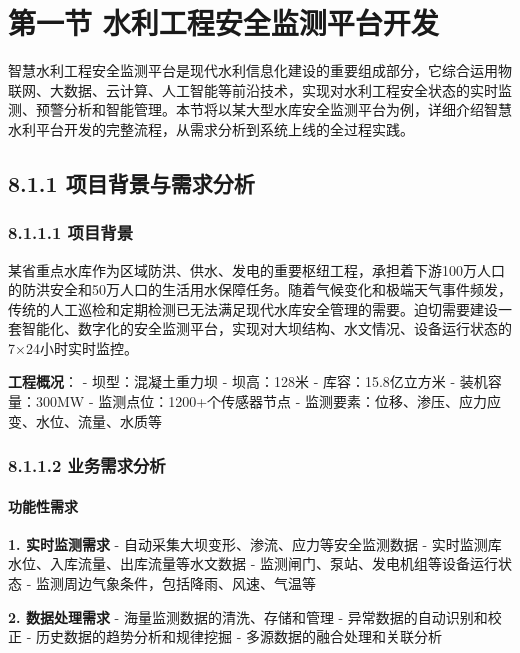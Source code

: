 \section{第一节
水利工程安全监测平台开发}\label{ux7b2cux4e00ux8282-ux6c34ux5229ux5de5ux7a0bux5b89ux5168ux76d1ux6d4bux5e73ux53f0ux5f00ux53d1}

智慧水利工程安全监测平台是现代水利信息化建设的重要组成部分，它综合运用物联网、大数据、云计算、人工智能等前沿技术，实现对水利工程安全状态的实时监测、预警分析和智能管理。本节将以某大型水库安全监测平台为例，详细介绍智慧水利平台开发的完整流程，从需求分析到系统上线的全过程实践。

\subsection{8.1.1
项目背景与需求分析}\label{ux9879ux76eeux80ccux666fux4e0eux9700ux6c42ux5206ux6790}

\subsubsection{8.1.1.1 项目背景}\label{ux9879ux76eeux80ccux666f}

某省重点水库作为区域防洪、供水、发电的重要枢纽工程，承担着下游100万人口的防洪安全和50万人口的生活用水保障任务。随着气候变化和极端天气事件频发，传统的人工巡检和定期检测已无法满足现代水库安全管理的需要。迫切需要建设一套智能化、数字化的安全监测平台，实现对大坝结构、水文情况、设备运行状态的7×24小时实时监控。

\textbf{工程概况}： - 坝型：混凝土重力坝 - 坝高：128米 -
库容：15.8亿立方米 - 装机容量：300MW - 监测点位：1200+个传感器节点 -
监测要素：位移、渗压、应力应变、水位、流量、水质等

\subsubsection{8.1.1.2
业务需求分析}\label{ux4e1aux52a1ux9700ux6c42ux5206ux6790}

\paragraph{功能性需求}\label{ux529fux80fdux6027ux9700ux6c42}

\textbf{1. 实时监测需求} - 自动采集大坝变形、渗流、应力等安全监测数据 -
实时监测库水位、入库流量、出库流量等水文数据 -
监测闸门、泵站、发电机组等设备运行状态 -
监测周边气象条件，包括降雨、风速、气温等

\textbf{2. 数据处理需求} - 海量监测数据的清洗、存储和管理 -
异常数据的自动识别和校正 - 历史数据的趋势分析和规律挖掘 -
多源数据的融合处理和关联分析

